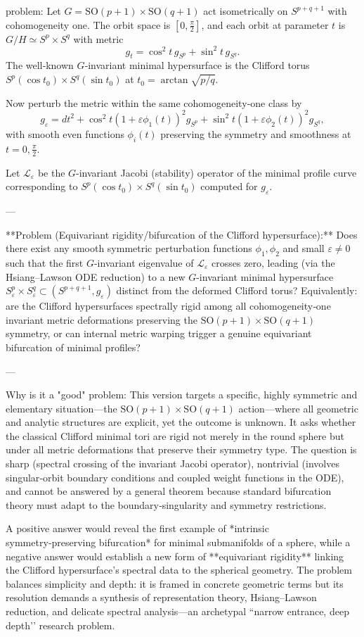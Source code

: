 problem:  
Let \(G=\mathrm{SO}(p+1)\times \mathrm{SO}(q+1)\) act isometrically on \(S^{p+q+1}\) with cohomogeneity one. The orbit space is \([0,\tfrac{\pi}{2}]\), and each orbit at parameter \(t\) is \(G/H\simeq S^{p}\!\!\times S^{q}\) with metric  
\[
g_t=\cos^2 t\, g_{S^p}+ \sin^2 t\, g_{S^q}.
\]
The well‑known \(G\)‑invariant minimal hypersurface is the Clifford torus \(S^p(\cos t_0)\times S^q(\sin t_0)\) at \(t_0=\arctan\!\sqrt{p/q}\).  

Now perturb the metric within the same cohomogeneity‑one class by  
\[
g_{\varepsilon}=dt^2+\cos^2 t(1+\varepsilon \phi_1(t))^2 g_{S^p}
+\sin^2 t(1+\varepsilon \phi_2(t))^2 g_{S^q},
\]
with smooth even functions \(\phi_i(t)\) preserving the symmetry and smoothness at \(t=0,\tfrac{\pi}{2}\).  

Let \(\mathcal{L}_\varepsilon\) be the \(G\)-invariant Jacobi (stability) operator of the minimal profile curve corresponding to \(S^p(\cos t_0)\times S^q(\sin t_0)\) computed for \(g_\varepsilon\).  

---

**Problem (Equivariant rigidity/bifurcation of the Clifford hypersurface):**  
Does there exist any smooth symmetric perturbation functions \(\phi_1,\phi_2\) and small \(\varepsilon\neq0\) such that the first \(G\)-invariant eigenvalue of \(\mathcal{L}_\varepsilon\) crosses zero, leading (via the Hsiang–Lawson ODE reduction) to a new \(G\)-invariant minimal hypersurface \(S^p_{\varepsilon}\!\times S^q_{\varepsilon}\subset (S^{p+q+1},g_\varepsilon)\) distinct from the deformed Clifford torus?  
Equivalently: are the Clifford hypersurfaces spectrally rigid among all cohomogeneity‑one invariant metric deformations preserving the \(\mathrm{SO}(p{+}1)\times\mathrm{SO}(q{+}1)\) symmetry, or can internal metric warping trigger a genuine equivariant bifurcation of minimal profiles?

---

Why is it a "good" problem:  
This version targets a specific, highly symmetric and elementary situation—the \(\mathrm{SO}(p{+}1)\times\mathrm{SO}(q{+}1)\) action—where all geometric and analytic structures are explicit, yet the outcome is unknown.  It asks whether the classical Clifford minimal tori are rigid not merely in the round sphere but under all metric deformations that preserve their symmetry type.  The question is sharp (spectral crossing of the invariant Jacobi operator), nontrivial (involves singular‑orbit boundary conditions and coupled weight functions in the ODE), and cannot be answered by a general theorem because standard bifurcation theory must adapt to the boundary‑singularity and symmetry restrictions.  

A positive answer would reveal the first example of *intrinsic symmetry‑preserving bifurcation* for minimal submanifolds of a sphere, while a negative answer would establish a new form of **equivariant rigidity** linking the Clifford hypersurface’s spectral data to the spherical geometry.  The problem balances simplicity and depth: it is framed in concrete geometric terms but its resolution demands a synthesis of representation theory, Hsiang–Lawson reduction, and delicate spectral analysis—an archetypal “narrow entrance, deep depth’’ research problem.